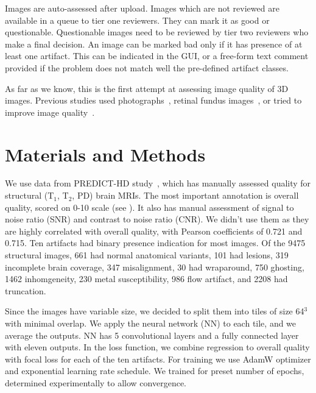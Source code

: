 \documentclass{midl} %
\begin{document}
Images are auto-assessed after upload.
Images which are not reviewed are available in a queue to tier one reviewers. They can mark it as good or questionable. Questionable images need to be reviewed by tier two reviewers who make a final decision. An image can be marked bad only if it has presence of at least one artifact. This can be indicated in the GUI, or a free-form text comment provided if the problem does not match well the pre-defined artifact classes.


As far as we know, this is the first attempt at assessing image quality of 3D images. Previous studies used photographs~\cite{bosse2017deep,hosu2020koniq}, retinal fundus images~\cite{yu2017image},
or tried to improve image quality~\cite{higaki2019improvement}.

\section{Materials and Methods}

We use data from PREDICT-HD study~\cite{paulsen2014clinical}, which has manually assessed quality for structural (T$_1$, T$_2$, PD) brain MRIs. The most important annotation is overall quality, scored on 0-10 scale (see ). It also has manual assessment of signal to noise ratio (SNR) and contrast to noise ratio (CNR). We didn't use them as they are highly correlated with overall quality, with Pearson coefficients of 0.721 and 0.715.
Ten artifacts had binary presence indication for most images. Of the 9475 structural images, 661 had normal anatomical variants, 101 had lesions, 319 incomplete brain coverage, 347 misalignment, 30 had wraparound, 750 ghosting, 1462 inhomgeneity, 230 metal susceptibility, 986 flow artifact, and 2208 had truncation.

Since the images have variable size, we decided to split them into tiles of size 64$^3$ with minimal overlap. We apply the neural network (NN) to each tile, and we average the outputs. NN has 5 convolutional layers and a fully connected layer with eleven outputs. In the loss function, we combine regression to overall quality with focal loss for each of the ten artifacts. For training we use AdamW optimizer and exponential learning rate schedule. We trained for preset number of epochs, determined experimentally to allow convergence.
\end{document}
